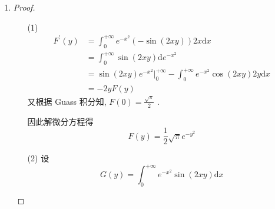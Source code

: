 \documentclass{article}
\begin{document}
\begin{enumerate}
\begin{enumerate}
\begin{proof}
            \begin{equation}
                \begin{aligned}
                    \lim_{n\rightarrow+\infty}\left(\frac{(2n-3)!!}{(2n-2)!!}\sqrt{n}\right)
                    &=\lim_{n\rightarrow+\infty}\frac{2}{\pi}\int_{0}^{+\infty}\frac{1}{\left(1+\frac{y^2}{n}\right)^n}\mathrm{d}y \\
                    &=\frac{2}{\pi}\int_{0}^{+\infty}e^{-y^2}\mathrm{d}y \\
                    &=\frac{2}{\pi}\frac{\sqrt{\pi}}{2} \\
                    &=\frac{1}{\sqrt{\pi}}
                \end{aligned}
                \nonumber
            \end{equation}
        \end{proof}
    \end{enumerate}
    \item \begin{proof}
        \begin{enumerate}
            \item[(1)] 
                \begin{equation}
                    \begin{aligned}
                        F^{'}(y)
                        &=\int_{0}^{+\infty}e^{-x^2}(-\sin(2xy))2x\mathrm{d}x \\
                        &=\int_{0}^{+\infty}\sin(2xy)\mathrm{d}e^{-x^2} \\
                        &=\sin(2xy)e^{-x^2}\bigg|_{0}^{+\infty}-\int_{0}^{+\infty}e^{-x^2}\cos(2xy)2y\mathrm{d}x \\
                        &=-2yF(y)
                    \end{aligned}
                    \nonumber
                \end{equation}
                又根据 Guass 积分知, $F(0)=\frac{\sqrt{\pi}}{2}$ . \par
                因此解微分方程得 \begin{equation}
                    F(y)=\frac{1}{2}\sqrt{\pi}e^{-y^2}
                    \nonumber
                \end{equation}
            \item[(2)] 设 \begin{equation}
                G(y)=\int_{0}^{+\infty}e^{-x^2}\sin(2xy)\mathrm{d}x
                \nonumber
            \end{equation}

\end{enumerate}
\end{proof}
\end{enumerate}
\end{document}
